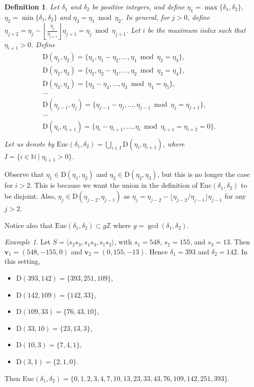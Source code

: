 \documentclass[11pt]{amsart}
\newtheorem{defn}[theorem]{Definition}
\theoremstyle{remark}
\newtheorem{example}[theorem]{Example}
\newcommand{\peb}[1]{\left\lfloor {#1}\right\rfloor}
\begin{document}
\begin{defn}\label{Euclidset}
	Let $\delta_1$ and $\delta_2$ be positive integers, and define $\eta_1=\max\{\delta_1,\delta_2\}$, $\eta_2=\min\{\delta_1,\delta_2\}$ and $\eta_3=\eta_1\bmod \eta_2$. In general, for $j>0$, define
	$\eta_{j+2}=\eta_j-\peb{\frac{\eta_j}{\eta_{j+1}}}\eta_{j+1}=\eta_j\bmod \eta_{j+1}$. Let $i$ be the maximum index such that $\eta_{i+1}>0$. Define
	\[
	\begin{array}{l}
	\mathrm D(\eta_1,\eta_2)=\{\eta_1,\eta_1-\eta_2,\ldots ,\eta_1\bmod \eta_2=\eta_3\}, \\
	\mathrm D(\eta_2,\eta_3)=\{\eta_2,\eta_2-\eta_3,\ldots ,\eta_2\bmod \eta_3=\eta_4\}, \\
	\mathrm D(\eta_3,\eta_4)=\{\eta_3-\eta_4,\ldots ,\eta_3\bmod \eta_4=\eta_5\}, \\
	\cdots \\
	\mathrm D(\eta_{j-1},\eta_j)=\{\eta_{j-1}-\eta_j,\ldots ,\eta_{j-1}\bmod \eta_j=\eta_{j+1}\}, \\
	\cdots \\
	\mathrm
	D(\eta_i,\eta_{i+1})=\{\eta_i-\eta_{i+1},\ldots ,\eta_i\bmod \eta_{i+1}=\eta_{i+2}=0\}. \\
	\end{array}
	\]
	Let us denote by $\mathrm{Euc}(\delta_1,\delta_2)=\bigcup_{i\in I}\mathrm D(\eta_i,\eta_{i+1})$, where $I=\{i\in\mathbb N \mid \eta_{i+1}>0\}$. 
\end{defn}
Observe that $\eta_1\in \mathrm D(\eta_1,\eta_2)$ and $\eta_2\in \mathrm D(\eta_2,\eta_3)$, but this is no longer the case for $i>2$. This is because we want the union in the definition of $\mathrm{Euc}(\delta_1,\delta_2)$ to be disjoint. Also, $\eta_j\in \mathrm D(\eta_{j-2},\eta_{j-1})$ as $\eta_j=\eta_{j-2}-\lfloor \eta_{j-2}/\eta_{j-1}\rfloor\eta_{j-1}$ for any $j>2$.

Notice also that $\mathrm{Euc}(\delta_1,\delta_2)\subset g\mathbb Z$ where $g=\gcd(\delta_1,\delta_2)$.

\begin{example}\label{mainexample-pre}
Let $S=\langle s_2s_3,s_1s_3,s_1s_2\rangle$, with $s_1=548$, $s_2=155$, and $s_3=13$. Then $\mathbf v_1=(548,-155,0)$ and $\mathbf v_2=(0,155,-13)$. Hence
$\delta_1=393$ and $\delta_2=142$. In this setting, 

\begin{itemize}
\item $\mathrm D(393,142)=\{393, 251, 109\}$,
\item $\mathrm D(142,109)=\{142,33\}$,
\item $\mathrm D(109,33)=\{76,43,10\}$, %
\item $\mathrm D(33,10)=\{23,13,3\}$,
\item $\mathrm D(10,3)=\{7,4,1\}$,
\item $\mathrm D(3,1)=\{2,1,0\}$.
\end{itemize}
Then $\mathrm{Euc}(\delta_1,\delta_2)=\{0,1,2,3,4,7,10,13,23,33,43,76,109,142,251,393\}$.
\end{example}
\end{document}
